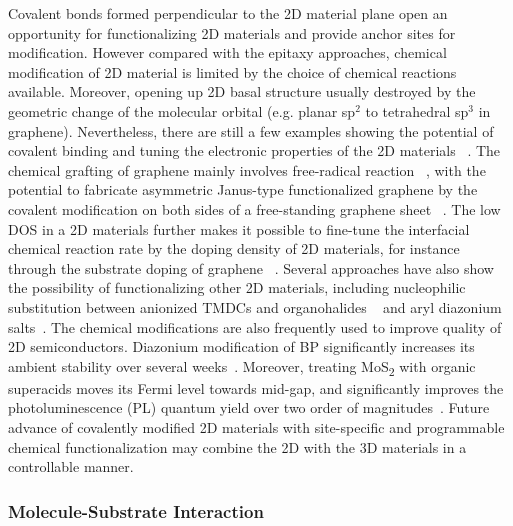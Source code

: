 Covalent bonds formed perpendicular to the 2D material plane open an
opportunity for functionalizing 2D materials and provide anchor sites
for modification. However compared with the epitaxy approaches,
chemical modification of 2D material is limited by the choice of
chemical reactions available. Moreover, opening up 2D basal structure
usually destroyed by the geometric change of the molecular orbital
(e.g. planar sp\(^{\text{2}}\) to tetrahedral sp\(^{\text{3}}\) in
graphene). Nevertheless, there are still a few examples showing the
potential of covalent binding and tuning the electronic properties of
the 2D materials
~\autocite{Georgakilas_2012_noncoval_gr_rev,Lee_2011_tempo_gr,Zhang_2013_janus_gr,Voiry_2014_cov_TMDC_phase,Vishnoi_2016_ar_mos2_covalent,Liu_2011_rev_chem_dope_gr,Wang_2012_ar_gr_react_rate}.
%
The chemical grafting of graphene mainly involves free-radical
reaction
~\autocite{Lee_2011_tempo_gr,Choi_2010_aminotempo_gr,Zhang_2013_janus_gr,Wang_2012_ar_gr_react_rate,Kumar_2014_2D_MOF_gr},
%
with the potential to fabricate asymmetric Janus-type functionalized
graphene by the covalent modification on both sides of a free-standing
graphene sheet ~\autocite{Zhang_2013_janus_gr}. The low DOS in a 2D
materials further makes it possible to fine-tune the interfacial
chemical reaction rate by the doping density of 2D materials, for
instance through the substrate doping of graphene
~\autocite{Wang_2012_ar_gr_react_rate}. Several approaches have also show
the possibility of functionalizing other 2D materials, including
nucleophilic substitution between anionized TMDCs and organohalides
~\autocite{Vishnoi_2016_ar_mos2_covalent} and aryl diazonium
salts~\autocite{Ryder_2016_TMDC_ad,Ryder_2016_phosphorene_ad}. The chemical modifications are also
frequently used to improve quality of 2D semiconductors.
%
Diazonium modification of BP significantly increases its ambient
stability over several
weeks~\autocite{Ryder_2016_phosphorene_ad}. Moreover, treating
MoS\textsubscript{2} with organic super\-acids moves its Fermi level
towards mid-gap, and significantly improves the
photo\-luminescence (PL) quantum yield over two order of
magnitudes~\autocite{Amani_2015_mos2_QY1}.
%
Future advance of covalently
modified 2D materials with site-specific and programmable chemical
functionalization may combine the 2D with the 3D materials in a
controllable manner.

\subsubsection{Molecule-Substrate Interaction}
\label{sec:intro-mol-subst}

